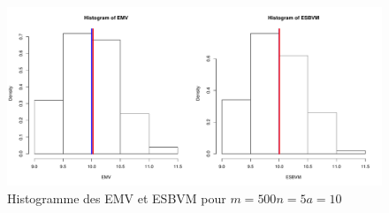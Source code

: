 \documentclass[12pt]{article}
\begin{document}
\begin{enumerate}
\begin{figure}[ht]
\label{graph1}
\centering
\includegraphics[width=1.0\textwidth]{figures/GraphP2Q35.pdf}
\caption{Histogramme des EMV et ESBVM pour $m=500 n=5 a=10$}
\end{figure}
\end{enumerate}

\end{document}
